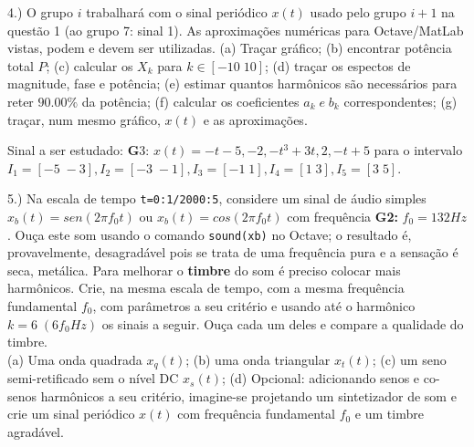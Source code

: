 \documentclass{article}
\begin{document}
\vspace{\baselineskip}

4.) O grupo $i$ trabalhará com o sinal periódico $x(t)$ usado pelo grupo $i + 1$ na questão 1 (ao grupo 7: sinal 1). As aproximações numéricas para Octave/MatLab vistas, podem e devem ser utilizadas.
(a) Traçar gráfico;
(b) encontrar potência total $P$;
(c) calcular os $X_{k}$ para $k \in [-10\;10]$;
(d) traçar os espectos de magnitude, fase e potência;
(e) estimar quantos harmônicos são necessários para reter $90.00\%$ da potência;
(f) calcular os coeficientes $a_{k}\;e\;b_{k}$ correspondentes;
(g) traçar, num mesmo gráfico, $x(t)$ e as aproximações.

Sinal a ser estudado: {\textbf G3}: $x(t) = -t - 5, -2, -t^3 + 3t, 2, -t + 5$ para o intervalo $I_{1} = [-5\;-3], I_{2} = [-3\;-1], I_{3} = [-1\;1], I_{4} = [1\;3], I_{5} = [3\;5]$.

\vspace{\baselineskip}

5.) Na escala de tempo {\tt t=0:1/2000:5}, considere um sinal de áudio simples $x_{b}(t) = sen(2 \pi f_{0}t)$ ou $x_{b}(t) = cos(2 \pi f_{0}t)$ com frequência \textbf{G2:} $f_{0} = 132Hz$. Ouça este som usando o comando {\tt sound(xb)} no Octave; o resultado é, provavelmente, desagradável pois se trata de uma frequência pura e a sensação é seca, metálica. Para melhorar o \textbf{timbre} do som é preciso colocar mais harmônicos. Crie, na mesma escala de tempo, com a mesma frequência fundamental $f_{0}$, com parâmetros a seu critério e usando até o harmônico $k = 6\;(6f_{0}Hz)$ os sinais a seguir. Ouça cada um deles e compare a qualidade do timbre.\\
(a) Uma onda quadrada $x_{q}(t)$;
(b) uma onda triangular $x_{t}(t)$;
(c) um seno semi-retificado sem o nível DC $x_{s}(t)$;
(d) Opcional: adicionando senos e co-senos harmônicos a seu critério, imagine-se projetando um sintetizador de som e crie um sinal periódico $x(t)$ com frequência fundamental $f_{0}$ e um timbre agradável.
\end{document}
